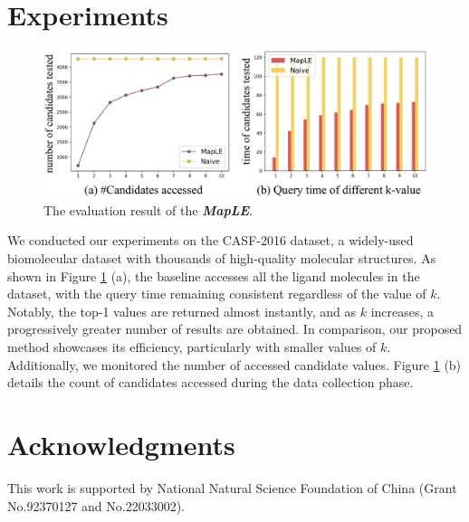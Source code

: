 \documentclass[letterpaper]{article} %
\begin{document}
\section{Experiments}
\begin{figure}[htp]
	\centering %
	\includegraphics[width=\linewidth  ]{images/result_cost2.eps}
	\caption{
		The evaluation result of the \textbf{\textit{MapLE}}.
	}
	\label{figure:result_cost}
\end{figure}
We conducted our experiments on the CASF-2016 dataset, a widely-used biomolecular dataset with thousands of high-quality molecular structures. As shown in Figure \ref{figure:result_cost} (a), the baseline accesses all the ligand molecules in the dataset, with the query time remaining consistent regardless of the value of $k$. Notably, the top-1 values are returned almost instantly, and as $k$ increases, a progressively greater number of results are obtained. In comparison, our proposed method showcases its efficiency, particularly with smaller values of $k$. Additionally, we monitored the number of accessed candidate values. Figure \ref{figure:result_cost} (b) details the count of candidates accessed during the data collection phase.

\section{Acknowledgments}
This work is supported by National Natural Science Foundation of China (Grant No.92370127 and No.22033002).


\end{document}
